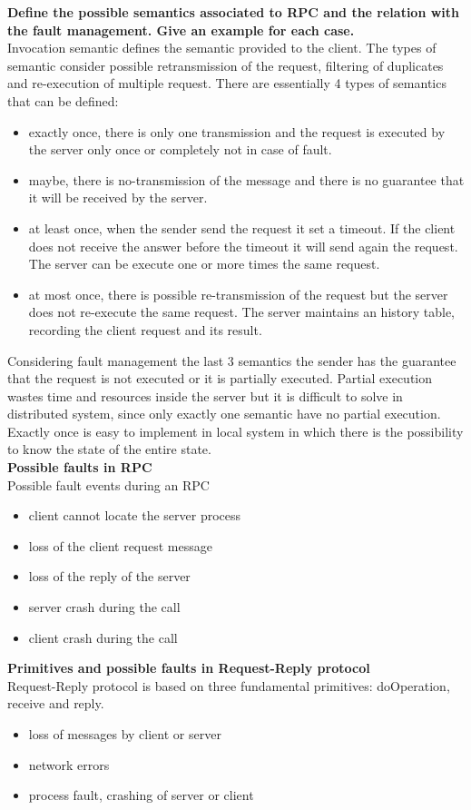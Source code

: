 \textbf{Define the possible semantics associated to RPC and the relation with the fault management. Give an example for each case.}\\
Invocation semantic defines the semantic provided to the client. The types of semantic consider possible retransmission of the request, filtering of duplicates and re-execution of multiple request. There are essentially 4 types of semantics that can be defined:
\begin{itemize}
	\item exactly once, there is only one transmission and the request is executed by the server only once or completely not in case of fault.
	\item maybe, there is no-transmission of the message and there is no guarantee that it will be received by the server.
	\item at least once, when the sender send the request it set a timeout. If the client does not receive the answer before the timeout it will send again the request. The server can be execute one or more times the same request.
	\item at most once, there is possible re-transmission of the request but the server does not re-execute the same request. The server maintains an history table, recording the client request and its result.
\end{itemize}
Considering fault management the last 3 semantics the sender has the guarantee that the request is not executed or it is partially executed. Partial execution wastes time and resources inside the server but it is difficult to solve in distributed system, since only exactly one semantic have no partial execution. Exactly once is easy to implement in local system in which there is the possibility to know the state of the entire state.\\


\textbf{Possible faults in RPC}\\
Possible fault events during an RPC
\begin{itemize}
	\item client cannot locate the server process 
	\item loss of the client request message
	\item loss of the reply of the server
	\item server crash during the call
	\item client crash during the call
\end{itemize}


\textbf{Primitives and possible faults in Request-Reply protocol}\\
Request-Reply protocol is based on three fundamental primitives: doOperation, receive and reply.
\begin{itemize}
	\item loss of messages by client or server
	\item network errors
	\item process fault, crashing of server or client
\end{itemize}


